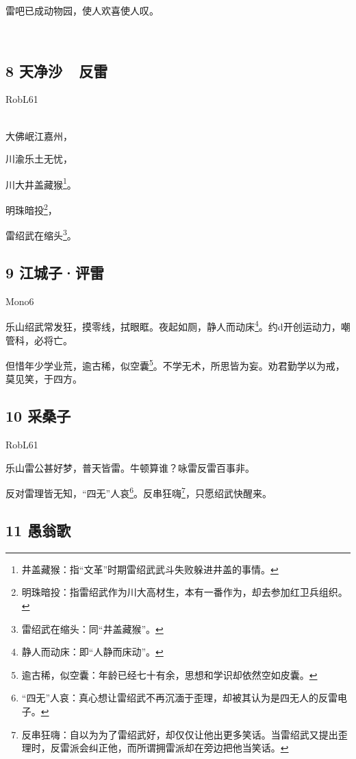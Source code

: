 雷吧已成动物园，使人欢喜使人叹。

~\\

\hypertarget{ux5929ux51c0ux6c99-ux53cdux96f7}{%
\subsection{8 天净沙~~反雷}\label{ux5929ux51c0ux6c99-ux53cdux96f7}}

RobL61

~\\
大佛岷江嘉州，

川渝乐土无忧，

川大井盖藏猴\footnote{井盖藏猴：指``文革''时期雷绍武武斗失败躲进井盖的事情。}。

明珠暗投\footnote{明珠暗投：指雷绍武作为川大高材生，本有一番作为，却去参加红卫兵组织。}，

雷绍武在缩头\footnote{雷绍武在缩头：同``井盖藏猴''。}。

\hypertarget{ux6c5fux57ceux5b50ux8bc4ux96f7}{%
\subsection{9 江城子·评雷}\label{ux6c5fux57ceux5b50ux8bc4ux96f7}}

Mono6

乐山绍武常发狂，摸零线，拭眼眶。夜起如厕，静人而动床\footnote{静人而动床：即``人静而床动''。}。约d开创运动力，嘲管科，必将亡。

但惜年少学业荒，逾古稀，似空囊\footnote{逾古稀，似空囊：年龄已经七十有余，思想和学识却依然空如皮囊。}。不学无术，所思皆为妄。劝君勤学以为戒，莫见笑，于四方。
~\\

\hypertarget{ux91c7ux6851ux5b50}{%
\subsection{10 采桑子}\label{ux91c7ux6851ux5b50}}

RobL61

乐山雷公甚好梦，普天皆雷。牛顿算谁？咏雷反雷百事非。

反对雷理皆无知，``四无''人哀\footnote{``四无''人哀：真心想让雷绍武不再沉湎于歪理，却被其认为是四无人的反雷电子。}。反串狂嗨\footnote{反串狂嗨：自以为为了雷绍武好，却仅仅让他出更多笑话。当雷绍武又提出歪理时，反雷派会纠正他，而所谓拥雷派却在旁边把他当笑话。}，只愿绍武快醒来。

\hypertarget{ux611aux7fc1ux6b4c}{%
\subsection{11 愚翁歌}\label{ux611aux7fc1ux6b4c}}


